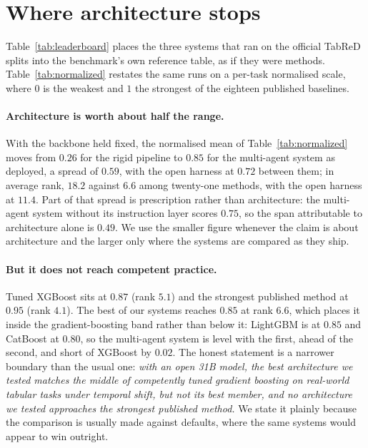 \section{Where architecture stops}
\label{sec:ceiling}

Table~\ref{tab:leaderboard} places the three systems that ran on the official
TabReD splits into the benchmark's own reference table, as if they were methods.
Table~\ref{tab:normalized} restates the same runs on a per-task normalised scale,
where $0$ is the weakest and $1$ the strongest of the eighteen published
baselines.




\paragraph{Architecture is worth about half the range.}
With the backbone held fixed, the normalised mean of Table~\ref{tab:normalized}
moves from $0.26$ for the rigid pipeline to $0.85$ for the multi-agent system as
deployed, a spread of $0.59$,
with the open harness at $0.72$ between them; in average rank, $18.2$ against
$6.6$ among twenty-one methods, with the open harness at $11.4$. Part of that
spread is prescription rather than architecture: the multi-agent system without
its instruction layer scores $0.75$, so the span attributable to architecture
alone is $0.49$. We use the smaller figure whenever the claim is about
architecture and the larger only where the systems are compared as they ship.

\paragraph{But it does not reach competent practice.}
Tuned XGBoost sits at $0.87$ (rank $5.1$) and the strongest published method at
$0.95$ (rank $4.1$). The best of our systems reaches $0.85$ at rank $6.6$, which
places it inside the gradient-boosting band rather than below it: LightGBM is at
$0.85$ and CatBoost at $0.80$, so the multi-agent system is level with the first,
ahead of the second, and short of XGBoost by $0.02$. The honest statement is a
narrower boundary than the usual one: \emph{with an open 31B model, the best
architecture we tested matches the middle of competently tuned gradient boosting
on real-world tabular tasks under temporal shift, but not its best member, and no
architecture we tested approaches the strongest published method.} We state it
plainly because the comparison is usually made against defaults, where the same
systems would appear to win outright.

